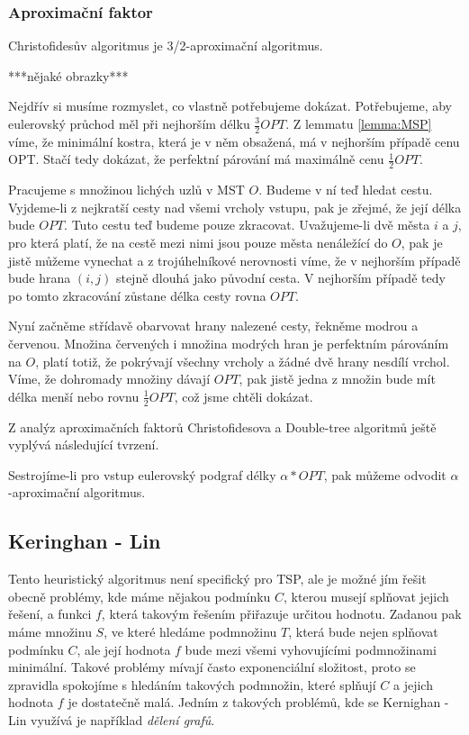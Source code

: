 \documentclass[
  biblatex,
  figures=false,
  glossaries,
  index
]{kidiplom}
\begin{document}
\subsubsection{Aproximační faktor}
\begin{theorem}
	Christofidesův algoritmus  je 3/2-aproximační algoritmus.
\end{theorem}
***nějaké obrazky***

	Nejdřív si musíme rozmyslet, co vlastně potřebujeme dokázat. Potřebujeme, aby eulerovský průchod měl při nejhorším délku $\frac{3}{2}OPT$. Z lemmatu \ref{lemma:MSP} víme, že minimální kostra, která je v něm obsažená, má v nejhorším případě cenu OPT. Stačí tedy dokázat, že perfektní párování má maximálně cenu $\frac{1}{2} OPT$.
	
	Pracujeme s množinou lichých uzlů v MST $O$. Budeme v ní teď hledat cestu. Vyjdeme-li z nejkratší cesty nad všemi vrcholy vstupu, pak je zřejmé, že její délka bude $OPT$. Tuto cestu teď budeme pouze zkracovat. Uvažujeme-li dvě města $i$ a $j$, pro která platí, že na cestě mezi nimi jsou pouze města nenáležící do $O$, pak je jistě můžeme vynechat a z trojúhelníkové nerovnosti víme, že v nejhorším případě bude hrana $(i,j)$ stejně dlouhá jako původní cesta. V nejhorším případě tedy po tomto zkracování zůstane délka cesty rovna $OPT$.
	
	Nyní začněme střídavě obarvovat hrany nalezené cesty, řekněme modrou a červenou. Množina červených i množina modrých hran je perfektním párováním na $O$, platí totiž, že pokrývají všechny vrcholy a žádné dvě hrany nesdílí vrchol. Víme, že dohromady množiny dávají $OPT$, pak jistě jedna z množin bude mít délka menší nebo rovnu $\frac{1}{2}OPT$, což jsme chtěli dokázat.
	
	Z analýz aproximačních faktorů Christofidesova a Double-tree algoritmů ještě vyplývá následující tvrzení.
\begin{lemma}
Sestrojíme-li pro vstup eulerovský podgraf délky $\alpha*OPT$, pak můžeme odvodit $\alpha$-aproximační algoritmus.
\end{lemma}

\begin{example}
\end{example}

\subsection{Keringhan - Lin}

Tento heuristický algoritmus není specifický pro TSP, ale je možné jím řešit obecně problémy, kde máme nějakou podmínku $C$, kterou musejí splňovat jejich řešení, a funkci $f$, která takovým řešením přiřazuje určitou hodnotu. Zadanou pak máme množinu $S$, ve které hledáme podmnožinu $T$, která bude nejen splňovat podmínku $C$, ale její hodnota $f$ bude mezi všemi vyhovujícími podmnožinami minimální. Takové problémy mívají často exponenciální složitost, proto se zpravidla spokojíme s hledáním takových podmnožin, které splňují $C$ a jejich hodnota $f$ je dostatečně malá. Jedním z takových problémů, kde se Kernighan - Lin využívá je například \textit{dělení grafů}. 
\end{document}
